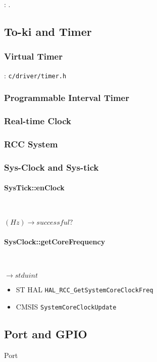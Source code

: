 : .

\subsection{To-ki and Timer}
\subsubsection{Virtual Timer}
: \verb`c/driver/timer.h`

\subsubsection{Programmable Interval Timer}
\subsubsection{Real-time Clock}

\subsubsection{RCC System}

\subsubsection{Sys-Clock and Sys-tick}

\paragraph{SysTick::enClock} \



$(Hz) \rightarrow successful?$

\paragraph{SysClock::getCoreFrequency} \


$\rightarrow stduint$

\begin{itemize}
\item ST HAL \verb`HAL_RCC_GetSystemCoreClockFreq`
\item CMSIS \verb`SystemCoreClockUpdate`
\end{itemize}



\subsection{Port and GPIO}
{Port}

